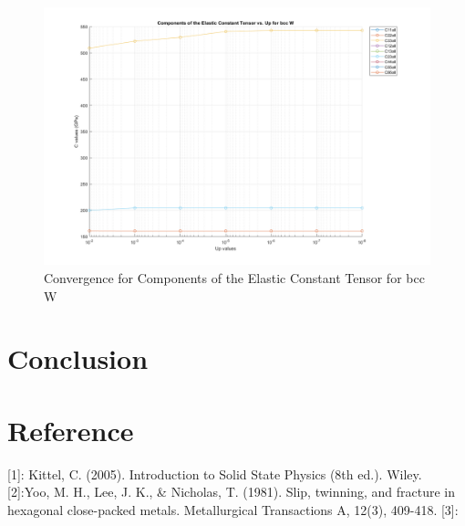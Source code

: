 \documentclass[a4paper,12pt]{article} %
\begin{document}
\begin{figure}[ht]
    \centering
    \includegraphics[width=1.1\textwidth]{W.png}
    \caption{Convergence for Components of the Elastic Constant Tensor for bcc W}
\end{figure}
\clearpage
\section*{Conclusion}

\section*{Reference}
[1]: Kittel, C. (2005). Introduction to Solid State Physics (8th ed.). Wiley.
[2]:Yoo, M. H., Lee, J. K., \& Nicholas, T. (1981). Slip, twinning, and fracture in hexagonal close-packed metals. Metallurgical Transactions A, 12(3), 409-418.
[3]:
\end{document}
